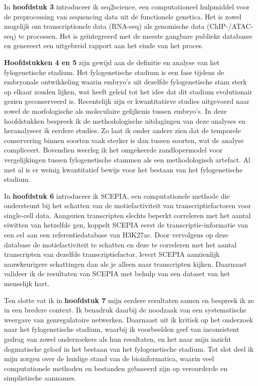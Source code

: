 In \textbf{hoofdstuk 3} introduceer ik seq2science, een computationeel hulpmiddel voor de preprocessing van sequencing data uit de functionele genetica. Het is zowel mogelijk om transcriptionele data (RNA-seq) als genomische data (ChIP-/ATAC-seq) te processen. Het is geïntegreerd met de meeste gangbare publieke databases en genereert een uitgebreid rapport aan het einde van het proces.

\textbf{Hoofdstukken 4 en 5} zijn gewijd aan de definitie en analyse van het fylogenetische stadium. Het fylogenetische stadium is een fase tijdens de embryonale ontwikkeling waarin embryo's uit dezelfde fylogenetische stam sterk op elkaar zouden lijken, wat heeft geleid tot het idee dat dit stadium evolutionair gezien geconserveerd is. Recentelijk zijn er kwantitatieve studies uitgevoerd naar zowel de morfologische als moleculaire gelijkenis tussen embryo's. In deze hoofdstukken bespreek ik de methodologische uitdagingen van deze analyses en heranalyseer ik eerdere studies. Zo laat ik onder andere zien dat de temporele conservering binnen soorten vaak sterker is dan tussen soorten, wat de analyse compliceert. Bovendien weerleg ik het omgekeerde zandlopermodel voor vergelijkingen tussen fylogenetische stammen als een methodologisch artefact. Al met al is er weinig kwantitatief bewijs voor het bestaan van het fylogenetische stadium.

In \textbf{hoofdstuk 6} introduceer ik SCEPIA, een computationele methode die ondersteunt bij het schatten van de motiefactiviteit van transcriptiefactoren voor single-cell data. Aangezien transcripten slechts beperkt correleren met het aantal eiwitten van hetzelfde gen, koppelt SCEPIA eerst de transcriptie-informatie van een cel aan een referentiedatabase van H3K27ac. Door vervolgens op deze database de motiefactiviteit te schatten en deze te correleren met het aantal transcripten van dezelfde transcriptiefactor, levert SCEPIA aanzienlijk nauwkeurigere schattingen dan als je alleen naar transcripten kijken. Daarnaast valideer ik de resultaten van SCEPIA met behulp van een dataset van het menselijk hart.

Ten slotte vat ik in \textbf{hoofdstuk 7} mijn eerdere resultaten samen en bespreek ik ze in een bredere context. Ik benadruk daarbij de noodzaak van een systematische weergave van genregulatoire netwerken. Daarnaast uit ik kritiek op het onderzoek naar het fylogenetische stadium, waarbij ik voorbeelden geef van inconsistent gedrag van zowel onderzoekers als hun resultaten, en het naar mijn inzicht dogmatische geloof in het bestaan van het fylogenetische stadium. Tot slot deel ik mijn zorgen over de huidige stand van de bioinformatica, waarin veel computationele methoden en bestanden gebaseerd zijn op verourderde en simplistische aannames.
